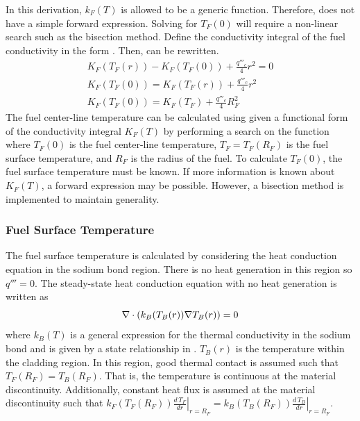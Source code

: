       In this derivation, $k_F(T)$ is allowed to be a generic function. 
      Therefore,  does not have a simple forward 
      expression. Solving for $T_F(0)$ will require a non-linear search such as
      the bisection method. Define the conductivity integral of the fuel
      conductivity in the form .
      Then,  can be rewritten.
      \begin{gather}
        K_F(T_F(r)) - K_F(T_F(0)) + \frac{q'''_c}{4} r^2 = 0 \\
        \label{eq:tfuel_r}
        K_F(T_F(0)) = K_F(T_F(r)) + \frac{q'''_c}{4} r^2 \\
        \label{eq:tcl_conductivity_integral}
        K_F(T_F(0)) = K_F(T_F) + \frac{q'''_c}{4} R_F^2
      \end{gather}
      The fuel center-line temperature can be calculated using
       given a functional form of the
      conductivity integral $K_F(T)$ by performing a search on the function
      where $T_F(0)$ is the fuel center-line temperature, $T_F=T_F(R_F)$ is the
      fuel surface temperature, and $R_F$ is the radius of the fuel. To
      calculate $T_F(0)$, the fuel surface temperature must be known.
      If more information is known about $K_F(T)$, a forward expression
      may be possible. However, a bisection method is implemented to maintain
      generality.

    \subsubsection{Fuel Surface Temperature}
      The fuel surface temperature is calculated by considering the heat
      conduction equation in the sodium bond region. There is no heat generation
      in this region so $q'''=0$.
      The steady-state heat conduction equation with no heat generation is
      written as
      \begin{equation}
        \label{eq:tc_grad}
        \mathbf{\nabla} \cdot (k_B(T_B(r)) \mathbf{\nabla} T_B(r)) = 0
      \end{equation}
      where $k_B(T)$ is a general expression for the thermal conductivity in the
      sodium bond and is given by a state relationship in \cite{sodiumProp}.
      $T_B(r)$ is the temperature within the cladding region.
      In this region, good thermal contact is
      assumed such that $T_F(R_F)=T_B(R_F)$. That is, the temperature is 
      continuous at the material discontinuity. Additionally, constant heat flux
      is assumed at the material discontinuity such that $k_F(T_F(R_F))
      \left.\frac{d\,T_F}{dr}\right|_{r=R_F} = k_B(T_B(R_F))
      \left.\frac{d\,T_B}{dr}\right|_{r=R_F}$.

